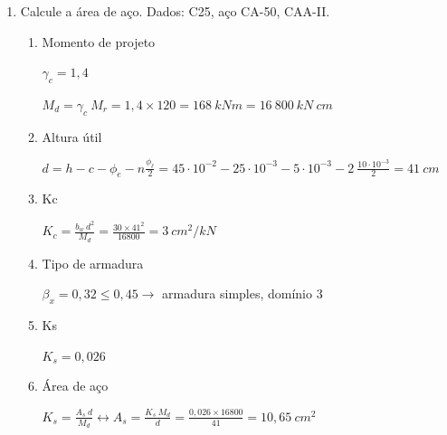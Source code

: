 \begin{enumerate}
    \item Calcule a área de aço. Dados: C25, aço CA-50, CAA-II.

    

    \begin{resposta}
        \begin{enumerate}
            \item Momento de projeto

            $\gamma_c = 1,4$ \cite[tabela 12.1]{nbr6118} \newline

            $M_d = \gamma_c \ M_r = 1,4 \times 120 = 168 \ kNm = 16\ 800\ kN \ cm$  \newline
            
            \item Altura útil

            $d = h - c - \phi_e - n\frac{\phi_\ell}{2} = 45 \cdot 10^{-2} - 25 \cdot 10^{-3} - 5 \cdot 10^{-3} - 2\ \frac{10 \cdot 10^{-3}}{2} = 41 \ cm$ \newline
            
            \item Kc

            $K_c = \frac{b_w \ d^2}{M_d} = \frac{30 \times 41^2}{16800} = 3 \ cm^2/kN$ \newline
            
            \item Tipo de armadura

            $\beta_x = 0,32 \leq 0,45 \to$ armadura simples, domínio 3 \cite[tabela 1.1a]{tabelaskcks} \newline
            
            \item Ks

            $K_s = 0,026$ \cite[tabela 1.1a]{tabelaskcks} \newline

            \item Área de aço

            $K_s = \frac{A_s \ d }{M_d} \longleftrightarrow A_s = \frac{K_s \ M_d}{d} = \frac{0,026 \times 16 800}{41} = 10,65 \ cm^2$
            
        \end{enumerate}
    \end{resposta}
\end{enumerate}